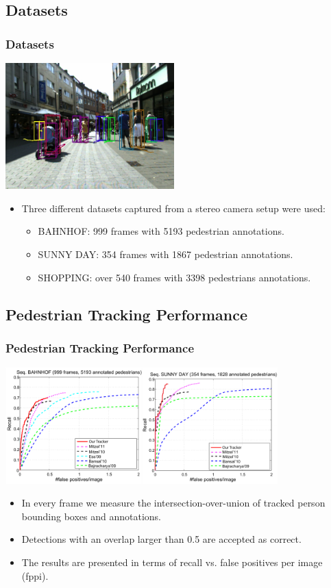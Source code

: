 \documentclass{beamer}
\begin{document}
\subsection{Datasets}
\begin{frame}
\frametitle{Datasets}
\begin{center}
  	\includegraphics[width=6.5cm]{shopping_example.jpg}
\end{center}
\begin{itemize}
	\item Three different datasets captured from a stereo camera setup
 were used:
	\begin{itemize}
		\item BAHNHOF: 999 frames with 5193 pedestrian annotations.
		\item SUNNY DAY: 354 frames with 1867 pedestrian annotations.
		\item SHOPPING: over 540 frames with 3398 pedestrians annotations.
\end{itemize}
\end{itemize}
\end{frame}

\subsection{Pedestrian Tracking Performance}
\begin{frame}
\frametitle{Pedestrian Tracking Performance} 
\begin{center}
  	\includegraphics[width=10.5cm]{dataset_graphs.pdf}
\end{center}
\begin{itemize}
	\item In every frame we measure the intersection-over-union of tracked person bounding boxes and annotations. 
	\item Detections with an overlap larger than 0.5 are accepted as correct.
	\item The results are presented in terms of recall vs. false positives per
image (fppi).

\end{itemize}
\end{frame}
\end{document}
